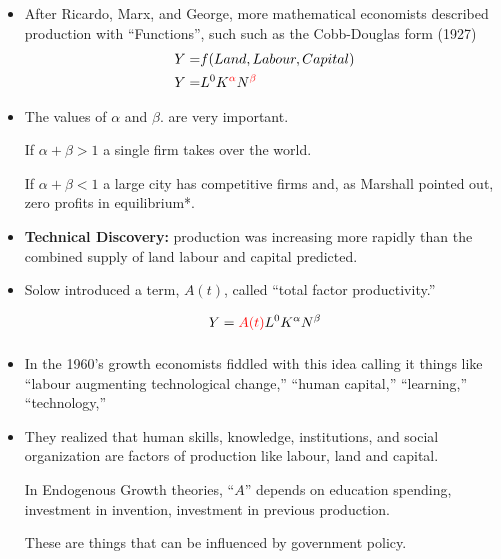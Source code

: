 \documentclass[notes]{beamer}
\begin{document}
\begin{frame}\frametitle{}

\begin{itemize}  
\item After Ricardo, Marx, and George, more mathematical economists described production with  ``Functions'', such such as the Cobb-Douglas  form (1927)
\begin{eqnarray*}
Y=& f(Land, Labour, Capital) \\ 
Y=&L^0 K^{\textcolor{red}{\alpha}} N^{\textcolor{red}{\beta}}
\end{eqnarray*}


\item The values of $\alpha$ and $\beta$. are very important. 

If $\alpha+\beta >1$ a single firm takes over the world.  

If $\alpha+\beta <1$ a large city has competitive firms and, as Marshall pointed out, zero profits in equilibrium*.

\pause


\item \textbf{\color{red}Technical Discovery:} production was increasing more rapidly than the combined supply of land labour and capital predicted. 

\item Solow introduced a term, $A(t)$,  called ``total factor productivity.'' 

\[Y= \textcolor{red} {A(t)} L^0 K^\alpha N^\beta\]

\end {itemize}
\end{frame}

\begin{frame}\frametitle{}
\begin{itemize} 


\item In the 1960's  growth economists fiddled with this idea calling it things like ``labour augmenting technological change,'' ``human capital,'' ``learning,'' ``technology,''

\item They realized that human skills, knowledge, institutions,  and social organization  
are factors of production like labour, land and capital.  \vspace{1cm}

In Endogenous Growth theories, ``$A$'' depends on education spending, investment in invention, investment in previous production. 

These are things that can be influenced by government policy.



\end {itemize}
\end{frame}
\end{document}
